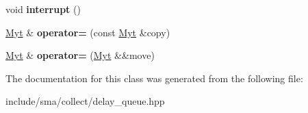 \begin{DoxyCompactItemize}
\item 
\hypertarget{classsma_1_1delay__queue_ae634dbb2bc1b6653ca8126d9372cf409}{void {\bfseries interrupt} ()}\label{classsma_1_1delay__queue_ae634dbb2bc1b6653ca8126d9372cf409}

\item 
\hypertarget{classsma_1_1delay__queue_a4459fdf29da74aac8777297bcff28261}{\hyperlink{classsma_1_1delay__queue}{Myt} \& {\bfseries operator=} (const \hyperlink{classsma_1_1delay__queue}{Myt} \&copy)}\label{classsma_1_1delay__queue_a4459fdf29da74aac8777297bcff28261}

\item 
\hypertarget{classsma_1_1delay__queue_a88a2c620324e29e0e448c4d04cb09bbd}{\hyperlink{classsma_1_1delay__queue}{Myt} \& {\bfseries operator=} (\hyperlink{classsma_1_1delay__queue}{Myt} \&\&move)}\label{classsma_1_1delay__queue_a88a2c620324e29e0e448c4d04cb09bbd}

\end{DoxyCompactItemize}


The documentation for this class was generated from the following file\-:\begin{DoxyCompactItemize}
\item 
include/sma/collect/delay\-\_\-queue.\-hpp\end{DoxyCompactItemize}
